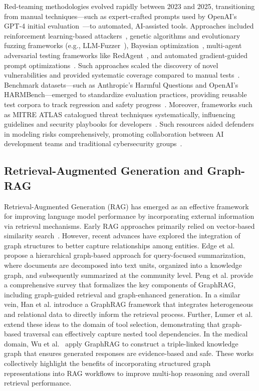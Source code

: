 Red-teaming methodologies evolved rapidly between 2023 and 2025, transitioning from manual techniques—such as expert-crafted prompts used by OpenAI's GPT-4 initial evaluation~\cite{kili2024redteaming}—to automated, AI-assisted tools. Approaches included reinforcement learning-based attackers~\cite{lee2023bayesian}, genetic algorithms and evolutionary fuzzing frameworks (e.g., LLM-Fuzzer~\cite{yu2024llmfuzzer}), Bayesian optimization~\cite{lee2023bayesian}, multi-agent adversarial testing frameworks like RedAgent~\cite{xu2024redagent}, and automated gradient-guided prompt optimizations~\cite{zou2023universal}. Such approaches scaled the discovery of novel vulnerabilities and provided systematic coverage compared to manual tests~\cite{yu2024llmfuzzer}. Benchmark datasets—such as Anthropic’s Harmful Questions and OpenAI’s HARMBench—emerged to standardize evaluation practices, providing reusable test corpora to track regression and safety progress~\cite{openreview2024multiturn}. Moreover, frameworks such as MITRE ATLAS catalogued threat techniques systematically, influencing guidelines and security playbooks for developers~\cite{mitre2025atlas}. Such resources aided defenders in modeling risks comprehensively, promoting collaboration between AI development teams and traditional cybersecurity groups~\cite{owasp2024top10llm}.

\subsection{Retrieval-Augmented Generation and Graph-RAG}

Retrieval-Augmented Generation (RAG) has emerged as an effective framework for improving language model performance by incorporating external information via retrieval mechanisms. Early RAG approaches primarily relied on vector-based similarity search~\cite{lewis2020retrieval}. However, recent advances have explored the integration of graph structures to better capture relationships among entities. Edge et al.\cite{edge2024local} propose a hierarchical graph-based approach for query-focused summarization, where documents are decomposed into text units, organized into a knowledge graph, and subsequently summarized at the community level. Peng et al.\cite{peng2024graph} provide a comprehensive survey that formalizes the key components of GraphRAG, including graph-guided retrieval and graph-enhanced generation. In a similar vein, Han et al.\cite{han2024retrieval} introduce a GraphRAG framework that integrates heterogeneous and relational data to directly inform the retrieval process. Further, Lumer et al.\cite{lumer2025graph} extend these ideas to the domain of tool selection, demonstrating that graph-based traversal can effectively capture nested tool dependencies. In the medical domain, Wu et al.~\cite{wu2024medical} apply GraphRAG to construct a triple-linked knowledge graph that ensures generated responses are evidence-based and safe. These works collectively highlight the benefits of incorporating structured graph representations into RAG workflows to improve multi-hop reasoning and overall retrieval performance.

